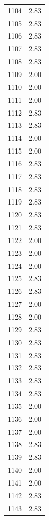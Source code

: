\documentclass[a4paper,11pt]{article}
\begin{document}
\begin{center}
\begin{longtable}{|R{1.5cm}|R{2.5cm}|}
 1104  &         2.83 \\ 
 1105  &         2.83 \\ 
 1106  &         2.83 \\ 
 1107  &         2.83 \\ 
 1108  &         2.83 \\ 
 1109  &         2.00 \\ 
 1110  &         2.00 \\ 
 1111  &         2.00 \\ 
 1112  &         2.83 \\ 
 1113  &         2.83 \\ 
 1114  &         2.00 \\ 
 1115  &         2.00 \\ 
 1116  &         2.83 \\ 
 1117  &         2.83 \\ 
 1118  &         2.83 \\ 
 1119  &         2.83 \\ 
 1120  &         2.83 \\ 
 1121  &         2.83 \\ 
 1122  &         2.00 \\ 
 1123  &         2.00 \\ 
 1124  &         2.00 \\ 
 1125  &         2.83 \\ 
 1126  &         2.83 \\ 
 1127  &         2.00 \\ 
 1128  &         2.00 \\ 
 1129  &         2.83 \\ 
 1130  &         2.83 \\ 
 1131  &         2.83 \\ 
 1132  &         2.83 \\ 
 1133  &         2.83 \\ 
 1134  &         2.83 \\ 
 1135  &         2.00 \\ 
 1136  &         2.00 \\ 
 1137  &         2.00 \\ 
 1138  &         2.83 \\ 
 1139  &         2.83 \\ 
 1140  &         2.00 \\ 
 1141  &         2.00 \\ 
 1142  &         2.83 \\ 
 1143  &         2.83 \\ 

\end{longtable}
\end{center}
\end{document}
